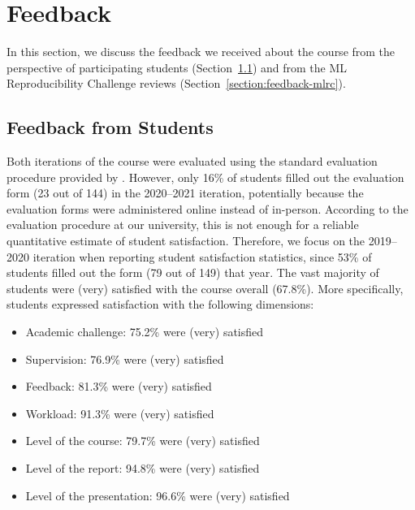 

\section{Feedback}
\label{section:feedback}

In this section, we discuss the feedback we received about the course from the perspective of participating students (Section~\ref{section:feedback-students}) and from the ML Reproducibility Challenge reviews (Section~\ref{section:feedback-mlrc}). 
 
\subsection{Feedback from Students}
\label{section:feedback-students}
Both iterations of the course were evaluated using the standard evaluation procedure provided by \OurUniversity. 
However, only 16\% of students filled out the evaluation form (23 out of 144) in the 2020--2021 iteration, potentially because the evaluation forms were administered online instead of in-person. 
According to the evaluation procedure at our university, this is not enough for a reliable quantitative estimate of student satisfaction.
Therefore, we focus on the 2019--2020 iteration when reporting student satisfaction statistics, since 53\% of students filled out the form (79 out of 149) that year. 
%
The vast majority of students were (very) satisfied with the course overall (67.8\%). 
More specifically, students expressed satisfaction with the following dimensions: 
\begin{itemize}
\setlength\itemsep{0.1em}
    \item Academic challenge: 75.2\% were (very) satisfied
    \item Supervision: 76.9\% were (very) satisfied
    \item Feedback: 81.3\% were (very) satisfied
    \item Workload: 91.3\% were (very) satisfied
    \item Level of the course: 79.7\% were (very) satisfied
    \item Level of the report: 94.8\% were (very) satisfied
    \item Level of the presentation: 96.6\% were (very) satisfied
\end{itemize}


